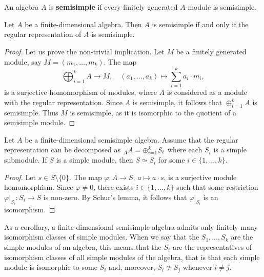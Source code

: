 \chapter{}

\begin{definition}
    An algebra $A$ is \textbf{semisimple} if every finitely generated $A$-module is semisimple. 
\end{definition}

\begin{proposition}
Let $A$ be a finite-dimensional algebra. Then $A$ is semisimple if and only if 
the regular representation of $A$ is semisimple. 
\end{proposition}

\begin{proof}
Let us prove the non-trivial implication. Let $M$ be a finitely generated module, say $M=(m_1,\dots,m_k)$. 
The map
\[
\bigoplus_{i=1}^k A\to M,\quad
(a_1,\dots,a_k)\mapsto \sum_{i=1}^k a_i\cdot m_i,
\]
is a surjective homomorphism of modules, where $A$ is considered as a module with the regular
representation. Since 
$A$ is semisimple, it follows that $\oplus_{i=1}^kA$ is semisimple. 
Thus $M$ is semisimple, as it is isomorphic to the quotient of a semisimple module.
\end{proof}

\begin{theorem}
Let $A$ be a finite-dimensional semisimple algebra. 
Assume that the regular representation can be decomposed as $\prescript{}{A}A=\oplus_{i=1}^k S_i$ where each $S_i$ is a simple submodule.  
If $S$ is a simple module, then $S\simeq S_i$ for some $i\in\{1,\dots,k\}$. 
\end{theorem}

\begin{proof}
Let $s\in S\setminus\{0\}$. The map $\varphi\colon A\to S$, $a\mapsto a\cdot s$, is a surjective module homomorphism. Since 
$\varphi\ne 0$, there exists $i\in\{1,\dots,k\}$ such that some restriction 
$\varphi|_{S_i}\colon S_i\to S$ is non-zero. By Schur's lemma, it follows that  
$\varphi|_{S_i}$ is an isomorphism.   	
\end{proof}

As a corollary, a finite-dimensional semisimple algebra admits 
only finitely many isomorphism classes of simple modules. When we say that 
the $S_1,\dots,S_k$ are the simple modules of an algebra, this means that the $S_i$ are the representatives
of isomorphism classes of all simple modules of the algebra, that is that each simple module is isomorphic to
some $S_i$ and, moreover,  
$S_i\not\simeq S_j$ whenever $i\ne j$. 

